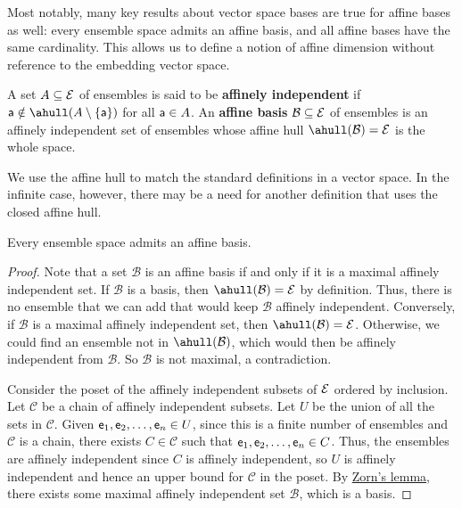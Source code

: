 Most notably, many key results about vector space bases are true for affine bases as well: every ensemble space admits an affine basis, and all affine bases have the same cardinality. This allows us to define a notion of affine dimension without reference to the embedding vector space.

\begin{mathSection}
\begin{defn}
	A set $A \subseteq \Ens$ of ensembles is said to be \textbf{affinely independent} if $\ens[a]\notin\ahull(A \setminus \{\ens[a]\})$ for all $\ens[a] \in A$. An \textbf{affine basis} $\mathcal{B} \subseteq \Ens$ of ensembles is an affinely independent set of ensembles whose affine hull $\ahull(\mathcal{B}) = \Ens$ is the whole space.
\end{defn}

\begin{remark}
	We use the affine hull to match the standard definitions in a vector space. In the infinite case, however, there may be a need for another definition that uses the closed affine hull.
\end{remark}

\begin{thrm}
	Every ensemble space admits an affine basis.
\end{thrm}

\begin{proof}
	Note that a set $\mathcal{B}$ is an affine basis if and only if it is a maximal affinely independent set. If $\mathcal{B}$ is a basis, then $\ahull(\mathcal{B}) = \Ens$ by definition. Thus, there is no ensemble that we can add that would keep $\mathcal{B}$ affinely independent. Conversely, if $\mathcal{B}$ is a maximal affinely independent set, then $\ahull(\mathcal{B}) = \Ens$. Otherwise, we could find an ensemble not in $\ahull(\mathcal{B})$, which would then be affinely independent from $\mathcal{B}$. So $\mathcal{B}$ is not maximal, a contradiction.
	
	Consider the poset of the affinely independent subsets of $\Ens$ ordered by inclusion. Let $\mathcal{C}$ be a chain of affinely independent subsets. Let $U$ be the union of all the sets in $\mathcal{C}$. Given $\ens[e]_1, \ens[e]_2, \ldots, \ens[e]_n \in U$, since this is a finite number of ensembles and $\mathcal{C}$ is a chain, there exists $C \in \mathcal{C}$ such that $\ens[e]_1, \ens[e]_2, \ldots, \ens[e]_n \in C$. Thus, the ensembles are affinely independent since $C$ is affinely independent, so $U$ is affinely independent and hence an upper bound for $\mathcal{C}$ in the poset. By \href{https://en.wikipedia.org/wiki/Zorn's_lemma}{Zorn's lemma}, there exists some maximal affinely independent set $\mathcal{B}$, which is a basis.
\end{proof}


\end{mathSection}
